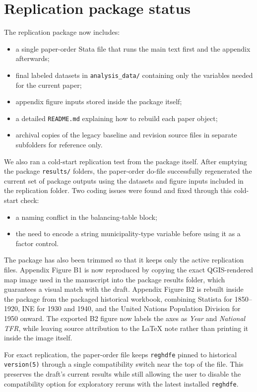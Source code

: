 \documentclass[11pt]{article}
\begin{document}
\section*{Replication package status}

The replication package now includes:
\begin{itemize}[leftmargin=*]
\item a single paper-order Stata file that runs the main text first and the appendix afterwards;
\item final labeled datasets in \texttt{analysis\_data/} containing only the variables needed for the current paper;
\item appendix figure inputs stored inside the package itself;
\item a detailed \texttt{README.md} explaining how to rebuild each paper object;
\item archival copies of the legacy baseline and revision source files in separate subfolders for reference only.
\end{itemize}

We also ran a cold-start replication test from the package itself. After emptying the package \texttt{results/} folders, the paper-order do-file successfully regenerated the current set of package outputs using the datasets and figure inputs included in the replication folder. Two coding issues were found and fixed through this cold-start check:
\begin{itemize}[leftmargin=*]
\item a naming conflict in the balancing-table block;
\item the need to encode a string municipality-type variable before using it as a factor control.
\end{itemize}

The package has also been trimmed so that it keeps only the active replication files. Appendix Figure B1 is now reproduced by copying the exact QGIS-rendered map image used in the manuscript into the package results folder, which guarantees a visual match with the draft. Appendix Figure B2 is rebuilt inside the package from the packaged historical workbook, combining Statista for 1850--1920, INE for 1930 and 1940, and the United Nations Population Division for 1950 onward. The exported B2 figure now labels the axes as \textit{Year} and \textit{National TFR}, while leaving source attribution to the LaTeX note rather than printing it inside the image itself.

For exact replication, the paper-order file keeps \texttt{reghdfe} pinned to historical \texttt{version(5)} through a single compatibility switch near the top of the file. This preserves the draft's current results while still allowing the user to disable the compatibility option for exploratory reruns with the latest installed \texttt{reghdfe}.
\end{document}
